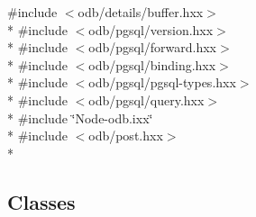 {\ttfamily \#include $<$odb/details/buffer.\+hxx$>$}\\*
{\ttfamily \#include $<$odb/pgsql/version.\+hxx$>$}\\*
{\ttfamily \#include $<$odb/pgsql/forward.\+hxx$>$}\\*
{\ttfamily \#include $<$odb/pgsql/binding.\+hxx$>$}\\*
{\ttfamily \#include $<$odb/pgsql/pgsql-\/types.\+hxx$>$}\\*
{\ttfamily \#include $<$odb/pgsql/query.\+hxx$>$}\\*
{\ttfamily \#include \char`\"{}Node-\/odb.\+ixx\char`\"{}}\\*
{\ttfamily \#include $<$odb/post.\+hxx$>$}\\*
\subsection*{Classes}
